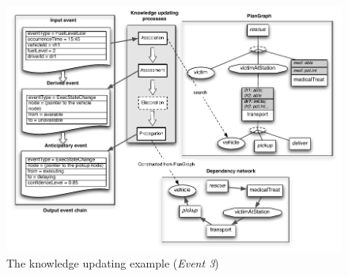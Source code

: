 \begin{figure}[htbp] %
	\centering
	\includegraphics{update_example_event3.pdf} 
	\caption{The knowledge updating example (\emph{Event 3})}
	\label{fig:update_example_event3}
\end{figure}



 

